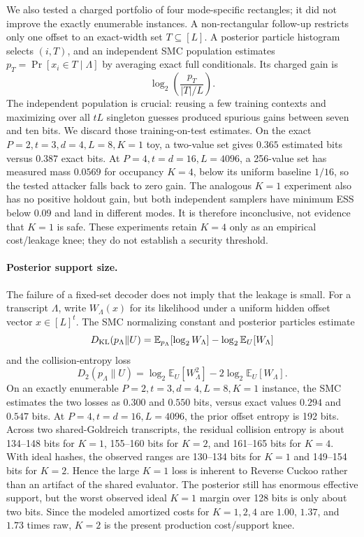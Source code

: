 We also tested a charged portfolio of four mode-specific rectangles; it did
not improve the exactly enumerable instances.  A non-rectangular follow-up
restricts only one offset to an exact-width set $T\subseteq[L]$.  A posterior
particle histogram selects $(i,T)$, and an independent SMC population estimates
$p_T=\Pr[x_i\in T\mid\Lambda]$ by averaging exact full conditionals.  Its
charged gain is
\[
  \log_2\left(\frac{p_T}{|T|/L}\right).
\]
The independent population is crucial: reusing a few training contexts and
maximizing over all $tL$ singleton guesses produced spurious gains between
seven and ten bits.  We discard those training-on-test estimates.  On the
exact $P=2,t=3,d=4,L=8,K=1$ toy, a two-value set gives $0.365$ estimated bits
versus $0.387$ exact bits.  At $P=4,t=d=16,L=4096$, a 256-value set has measured
mass $0.0569$ for occupancy $K=4$, below its uniform baseline $1/16$, so the
tested attacker falls back to zero gain.  The analogous $K=1$ experiment also
has no positive holdout gain, but both independent samplers have minimum ESS
below $0.09$ and land in different modes.  It is therefore inconclusive, not
evidence that $K=1$ is safe.  These experiments retain $K=4$ only as an
empirical cost/leakage knee; they do not establish a security threshold.

\paragraph{Posterior support size.}
The failure of a fixed-set decoder does not imply that the leakage is small.
For a transcript $\Lambda$, write $W_\Lambda(x)$ for its likelihood under a
uniform hidden offset vector $x\in[L]^t$.  The SMC normalizing constant and
posterior particles estimate
\[
 D_{\rm KL}(p_\Lambda\|U)
 =\mathbb E_{p_\Lambda}[\log_2 W_\Lambda]
   -\log_2\mathbb E_U[W_\Lambda]
\]
and the collision-entropy loss
\[
 D_2(p_\Lambda\|U)
 =\log_2\mathbb E_U[W_\Lambda^2]
   -2\log_2\mathbb E_U[W_\Lambda].
\]
On an exactly enumerable $P=2,t=3,d=4,L=8,K=1$ instance, the SMC estimates
the two losses as $0.300$ and $0.550$ bits, versus exact values $0.294$ and
$0.547$ bits.  At $P=4,t=d=16,L=4096$, the prior offset entropy is 192 bits.
Across two shared-Goldreich transcripts, the residual collision entropy is
about 134--148 bits for $K=1$, 155--160 bits for $K=2$, and 161--165 bits for
$K=4$.  With ideal hashes, the observed ranges are 130--134 bits for $K=1$
and 149--154 bits for $K=2$.  Hence the large $K=1$ loss is inherent to
Reverse Cuckoo rather than an artifact of the shared evaluator.  The posterior
still has enormous effective support, but the worst observed ideal $K=1$
margin over 128 bits is only about two bits.  Since the modeled amortized costs
for $K=1,2,4$ are $1.00$, $1.37$, and $1.73$ times raw, $K=2$ is the present
production cost/support knee.

